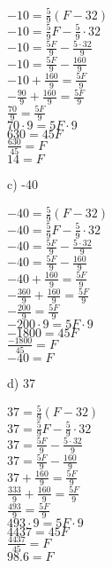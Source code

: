 \documentclass[12pt]{article}
\begin{document}
\begin{center}
$-10=\displaystyle \frac{5}{9}(F-32)$ \\
$-10=\displaystyle \frac{5}{9}F-\displaystyle \frac{5}{9}\cdot32$ \\
$-10=\displaystyle \frac{5F}{9}-\displaystyle \frac{5\cdot32}{9}$ \\
$-10=\displaystyle \frac{5F}{9}-\displaystyle \frac{160}{9}$ \\
$-10+\displaystyle \frac{160}{9}=\displaystyle \frac{5F}{9}$ \\
$-\displaystyle \frac{90}{9}+\displaystyle \frac{160}{9}=\displaystyle \frac{5F}{9}$ \\
$\displaystyle \frac{70}{9}=\displaystyle \frac{5F}{9}$ \\
$70\cdot9=5F\cdot9$ \\
$630=45F$ \\
$\displaystyle \frac{630}{45}=F$ \\
$14=F$
\end{center}
c) -40
\begin{center}
$-40=\displaystyle \frac{5}{9}(F-32)$ \\
$-40=\displaystyle \frac{5}{9}F-\displaystyle \frac{5}{9}\cdot32$ \\
$-40=\displaystyle \frac{5F}{9}-\displaystyle \frac{5\cdot32}{9}$ \\
$-40=\displaystyle \frac{5F}{9}-\displaystyle \frac{160}{9}$ \\
$-40+\displaystyle \frac{160}{9}=\displaystyle \frac{5F}{9}$ \\
$-\displaystyle \frac{360}{9}+\displaystyle \frac{160}{9}=\displaystyle \frac{5F}{9}$ \\
$-\displaystyle \frac{200}{9}=\displaystyle \frac{5F}{9}$ \\
$-200\cdot9=5F\cdot9$ \\
$-1800=45F$ \\
$\displaystyle \frac{-1800}{45}=F$ \\
$-40=F$
\end{center}
d) 37
\begin{center}
$37=\displaystyle \frac{5}{9}(F-32)$ \\
$37=\displaystyle \frac{5}{9}F-\displaystyle \frac{5}{9}\cdot32$ \\
$37=\displaystyle \frac{5F}{9}-\displaystyle \frac{5\cdot32}{9}$ \\
$37=\displaystyle \frac{5F}{9}-\displaystyle \frac{160}{9}$ \\
$37+\displaystyle \frac{160}{9}=\displaystyle \frac{5F}{9}$ \\
$\displaystyle \frac{333}{9}+\displaystyle \frac{160}{9}=\displaystyle \frac{5F}{9}$ \\
$\displaystyle \frac{493}{9}=\displaystyle \frac{5F}{9}$ \\
$493\cdot9=5F\cdot9$ \\
$4437=45F$ \\
$\displaystyle \frac{4437}{45}=F$ \\
$98.6=F$
\end{center}
\end{document}
